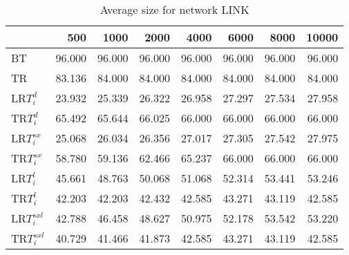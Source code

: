 \begin{table}
\begin{center}
\begin{tabular}{lrrrrrrr}
 & 500 & 1000 & 2000 & 4000 & 6000 & 8000 & 10000\\\hline
BT & 96.000 & 96.000 & 96.000 & 96.000 & 96.000 & 96.000 & 96.000\\\hline
TR & 83.136 & 84.000 & 84.000 & 84.000 & 84.000 & 84.000 & 84.000\\\hline
LR$T_i^d$ & 23.932 & 25.339 & 26.322 & 26.958 & 27.297 & 27.534 & 27.958\\\hline
TR$T_i^d$ & 65.492 & 65.644 & 66.025 & 66.000 & 66.000 & 66.000 & 66.000\\\hline
LR$T_i^{sx}$ & 25.068 & 26.034 & 26.356 & 27.017 & 27.305 & 27.542 & 27.975\\\hline
TR$T_i^{sx}$ & 58.780 & 59.136 & 62.466 & 65.237 & 66.000 & 66.000 & 66.000\\\hline
LR$T_i^l$ & 45.661 & 48.763 & 50.068 & 51.068 & 52.314 & 53.441 & 53.246\\\hline
TR$T_i^l$ & 42.203 & 42.203 & 42.432 & 42.585 & 43.271 & 43.119 & 42.585\\\hline
LR$T_i^{sxl}$ & 42.788 & 46.458 & 48.627 & 50.975 & 52.178 & 53.542 & 53.220\\\hline
TR$T_i^{sxl}$ & 40.729 & 41.466 & 41.873 & 42.585 & 43.271 & 43.119 & 42.585\\\hline
\end{tabular}
\end{center}
\caption{Average size for network LINK }
\label{Linksi}
\end{table}

